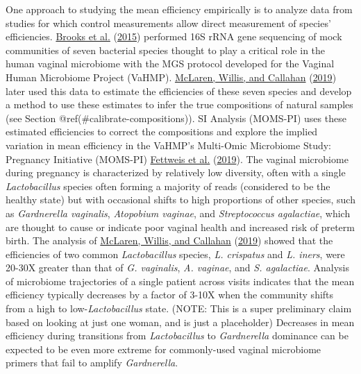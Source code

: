 \documentclass[
]{article}
\theoremstyle{definition}
\theoremstyle{definition}
\theoremstyle{definition}
\theoremstyle{definition}
\theoremstyle{remark}
\begin{document}
One approach to studying the mean efficiency empirically is to analyze data from studies for which control measurements allow direct measurement of species' efficiencies.
\protect\hyperlink{ref-brooks2015thet}{Brooks et al.} (\protect\hyperlink{ref-brooks2015thet}{2015}) performed 16S rRNA gene sequencing of mock communities of seven bacterial species thought to play a critical role in the human vaginal microbiome with the MGS protocol developed for the Vaginal Human Microbiome Project (VaHMP). \protect\hyperlink{ref-mclaren2019cons}{McLaren, Willis, and Callahan} (\protect\hyperlink{ref-mclaren2019cons}{2019}) later used this data to estimate the efficiencies of these seven species and develop a method to use these estimates to infer the true compositions of natural samples (see Section @ref(\#calibrate-compositions)).
SI Analysis (MOMS-PI) uses these estimated efficiencies to correct the compositions and explore the implied variation in mean efficiency in the VaHMP's Multi-Omic Microbiome Study: Pregnancy Initiative (MOMS-PI) \protect\hyperlink{ref-fettweis2019thev}{Fettweis et al.} (\protect\hyperlink{ref-fettweis2019thev}{2019}).
The vaginal microbiome during pregnancy is characterized by relatively low diversity, often with a single \emph{Lactobacillus} species often forming a majority of reads (considered to be the healthy state) but with occasional shifts to high proportions of other species, such as \emph{Gardnerella vaginalis}, \emph{Atopobium vaginae}, and \emph{Streptococcus agalactiae}, which are thought to cause or indicate poor vaginal health and increased risk of preterm birth.
The analysis of \protect\hyperlink{ref-mclaren2019cons}{McLaren, Willis, and Callahan} (\protect\hyperlink{ref-mclaren2019cons}{2019}) showed that the efficiencies of two common \emph{Lactobacillus} species, \emph{L. crispatus} and \emph{L. iners}, were 20-30X greater than that of \emph{G. vaginalis}, \emph{A. vaginae}, and \emph{S. agalactiae}.
Analysis of microbiome trajectories of a single patient across visits indicates that the mean efficiency typically decreases by a factor of 3-10X when the community shifts from a high to low-\emph{Lactobacillus} state.
(NOTE: This is a super preliminary claim based on looking at just one woman, and is just a placeholder)
Decreases in mean efficiency during transitions from \emph{Lactobacillus} to \emph{Gardnerella} dominance can be expected to be even more extreme for commonly-used vaginal microbiome primers that fail to amplify \emph{Gardnerella}.
\end{document}
